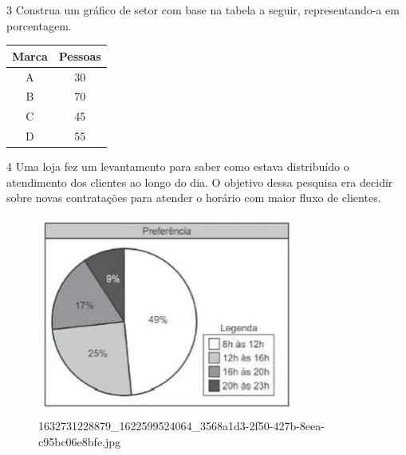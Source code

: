 {{{\begin{escolha}
{{{{\begin{escolha}
\begin{escolha}
{\num{3} Construa um gráfico de setor com base na tabela a seguir,
representando-a em porcentagem.

\begin{table}[]
\begin{tabular}{|c|c|}
\hline
\rowcolor[HTML]{DAE8FC} 
\textbf{Marca} & \textbf{Pessoas} \\ \hline
A & 30 \\ \hline
B & 70 \\ \hline
C & 45 \\ \hline
D & 55 \\ \hline
\end{tabular}
\end{table}




\num{4} Uma loja fez um levantamento para saber como estava distribuído o
atendimento dos clientes ao longo do dia. O objetivo dessa pesquisa era decidir
sobre novas contratações para atender o horário com maior fluxo de clientes.

\begin{figure}
\centering
\includegraphics[width=3.32598in,height=2.58268in]{./_SAEB_9_MAT/media/image214.jpg}
\caption{1632731228879\_1622599524064\_3568a1d3-2f50-427b-8eea-c95bc06e8bfe.jpg}
\end{figure}

}
\end{escolha}
\end{escolha}}}}}
\end{escolha}}}}
